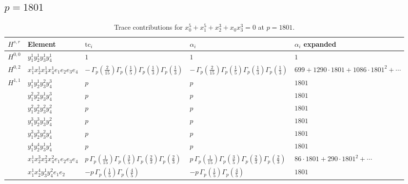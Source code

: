 \documentclass[11pt]{article}
\begin{document}
\subsection*{$p = 1801$}

\begin{table}[ht]
\centering
\caption{Trace contributions for $x_0^{5} + x_1^{5} + x_2^{3} + x_0 x_3^{3} = 0$ at $p=1801$.}\label{tab:deformed-40}
\renewcommand{\arraystretch}{1.1}
{\scriptsize
\begin{tabular}{@{}lllll@{}}
\toprule
$H^{s,r}$ & Element & $\mathrm{tc}_i$ & $\alpha_i$ & $\alpha_i$ expanded \\
\midrule
$H^{0,0}$ & $y_{1}^{1} y_{2}^{1} y_{3}^{1} y_{4}^{1}$ & $1$ & $1$ & $1$ \\
\midrule
$H^{0,2}$ & $x_{1}^{1} x_{2}^{1} x_{3}^{1} x_{4}^{1}  e_{1} e_{2} e_{3} e_{4}$ & $- \, \Gamma_p \left( \frac{2}{15} \right) \Gamma_p \left( \frac{1}{5} \right) \Gamma_p \left( \frac{1}{3} \right) \Gamma_p \left( \frac{1}{3} \right)$ & $- \, \Gamma_p \left( \frac{2}{15} \right) \Gamma_p \left( \frac{1}{5} \right) \Gamma_p \left( \frac{1}{3} \right) \Gamma_p \left( \frac{1}{3} \right)$ & $699{+}1290{\cdot}1801{+}1086{\cdot}1801^{2}{+}\cdots$ \\
\midrule
$H^{1,1}$ & $y_{1}^{1} y_{2}^{1} y_{3}^{2} y_{4}^{3}$ & $p \,$ & $p \,$ & $1801$ \\
 & $y_{1}^{2} y_{2}^{2} y_{3}^{1} y_{4}^{3}$ & $p \,$ & $p \,$ & $1801$ \\
 & $y_{1}^{2} y_{2}^{2} y_{3}^{2} y_{4}^{2}$ & $p \,$ & $p \,$ & $1801$ \\
 & $y_{1}^{3} y_{2}^{3} y_{3}^{1} y_{4}^{2}$ & $p \,$ & $p \,$ & $1801$ \\
 & $y_{1}^{3} y_{2}^{3} y_{3}^{2} y_{4}^{1}$ & $p \,$ & $p \,$ & $1801$ \\
 & $y_{1}^{4} y_{2}^{4} y_{3}^{1} y_{4}^{1}$ & $p \,$ & $p \,$ & $1801$ \\
 & $x_{1}^{1} x_{2}^{3} x_{3}^{2} x_{4}^{2}  e_{1} e_{2} e_{3} e_{4}$ & $p \, \Gamma_p \left( \frac{1}{15} \right) \Gamma_p \left( \frac{3}{5} \right) \Gamma_p \left( \frac{2}{3} \right) \Gamma_p \left( \frac{2}{3} \right)$ & $p \, \Gamma_p \left( \frac{1}{15} \right) \Gamma_p \left( \frac{3}{5} \right) \Gamma_p \left( \frac{2}{3} \right) \Gamma_p \left( \frac{2}{3} \right)$ & $86{\cdot}1801{+}290{\cdot}1801^{2}{+}\cdots$ \\
 & $x_{1}^{1} x_{2}^{4} y_{3}^{1} y_{4}^{2} e_{1} e_{2}$ & $- p \, \Gamma_p \left( \frac{1}{5} \right) \Gamma_p \left( \frac{4}{5} \right)$ & $- p \, \Gamma_p \left( \frac{1}{5} \right) \Gamma_p \left( \frac{4}{5} \right)$ & $1801$ \\

\end{tabular}}
\end{table}
\end{document}
